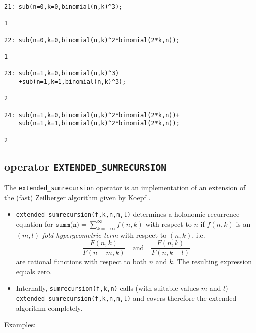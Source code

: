 {\small
\begin{verbatim}
21: sub(n=0,k=0,binomial(n,k)^3);

1

22: sub(n=0,k=0,binomial(n,k)^2*binomial(2*k,n));

1

23: sub(n=1,k=0,binomial(n,k)^3)
    +sub(n=1,k=1,binomial(n,k)^3);

2

24: sub(n=1,k=0,binomial(n,k)^2*binomial(2*k,n))+
    sub(n=1,k=1,binomial(n,k)^2*binomial(2*k,n));

2
\end{verbatim}
}\noindent

\subsection{\REDUCE{} operator \texttt{EXTENDED\_SUMRECURSION}}
\label{sec:EXTENDED_SUMRECURSION}
\hypertarget{operator:EXTENDED_SUMRECURSION}{}

The \texttt{extended\_sumrecursion} operator is an implementation
of an extension of the (fast) Zeilberger algorithm given by Koepf
\cite{Koepf:94b}.
\begin{itemize}
\item
\texttt{extended\_sumrecursion(f,k,n,m,l)} determines a holonomic recurrence
equation for $\texttt{summ(n)} =\sum\limits_{k=-\infty}^\infty f(n,k)$
with respect to $n$ if $f(n,k)$ is an \textsl{$(m,l)$-fold hypergeometric term}
with respect to $(n,k)$, i.e.
\[
\frac{F(n,k)}{F(n-m,k)}
\quad
\mbox{and}
\quad
\frac{F(n,k)}{F(n,k-l)}
\]
are rational functions with respect to both $n$ and $k$.
The resulting expression equals zero.
\item
  Internally, 
  \texttt{sumrecursion(f,k,n)} calls (with suitable values $m$ and $l$)
  \texttt{extended\_sumrecursion(f,k,n,m,l)}
and covers therefore the extended
algorithm completely.
\end{itemize}
Examples:

